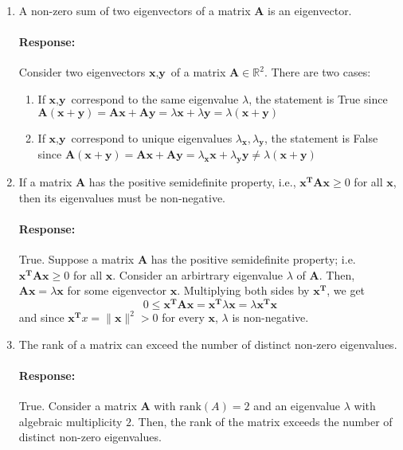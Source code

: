 \documentclass [11pt] {article}
\newcommand{\R}{\mathbb{R}}
\newcommand{\T}{\bf{T}}
\newcommand{\x}{\bf{x}}
\newcommand{\A}{\bf{A}}
\newenvironment{response}{\vspace{-10pt}\paragraph{Response:}}{}
\renewcommand{\bf}[1]{\textbf{{#1}}}
\begin{document}
\begin{enumerate}
\begin{enumerate}
\begin{enumerate}[itemsep=10pt]
                    \item A non-zero sum of two eigenvectors of a matrix $\A$ is an eigenvector.
                        \begin{response}
                            Consider two eigenvectors $\bf{x}, \bf{y}$ of a matrix
                            $\A \in \R^2$. There are two cases:
                            \begin{enumerate}[label=\textit{Case \arabic*:},leftmargin=*]
                                \item If $\bf{x}, \bf{y}$ correspond to the same eigenvalue $\lambda$, 
                                    the statement is True since 
                                    $\A(\bf{x} + \bf{y}) = \A \bf{x} + \A \bf{y} = \lambda \bf{x} + \lambda \bf{y} = \lambda(\bf{x} + \bf{y})$
                                \item If $\bf{x}, \bf{y}$ correspond to unique eigenvalues 
                                    $\lambda_{\bf{x}}, \lambda_{\bf{y}}$, the statement is False since
                                    $\A(\bf{x} + \bf{y}) = \A \bf{x} + \A \bf{y} = \lambda_{\bf{x}} \bf{x} + \lambda_{\bf{y}} \bf{y} \neq \lambda(\bf{x} + \bf{y})$
                            \end{enumerate}
                        \end{response}

                    \item If a matrix $\A$ has the positive semidefinite property, i.e., 
                        $\x^{\T} \A \x \geq 0$ for all $\x$, then its eigenvalues must be
                        non-negative.
                        \begin{response}
                            True. Suppose a matrix $\A$ has the positive semidefinite
                            property; i.e. $\x^{\T} \A \x \geq 0$ for all $\x$. Consider an arbirtrary
                            eigenvalue $\lambda$ of $\A$. Then, $\A \x = \lambda \x$ for some eigenvector
                            $\x$. Multiplying both sides by $\x^{\T}$, we get 
                            \[0 \leq \x^{\T} \A \x = \x^{\T} \lambda \x = \lambda \x^{\T} \x\]
                            and since $\x^{\T}x = \|\x\|^2 > 0$ for every $\x$, $\lambda$ is non-negative.
                        \end{response}

                    \item The rank of a matrix can exceed the number of distinct non-zero 
                        eigenvalues.
                        \begin{response}
                            True. Consider a matrix $\A$ with $\text{rank}(A) = 2$ and 
                            an eigenvalue $\lambda$ with algebraic multiplicity $2$. Then, the rank of
                            the matrix exceeds the number of distinct non-zero eigenvalues.
                        \end{response}


\end{enumerate}
\end{enumerate}
\end{enumerate}
\end{document}

